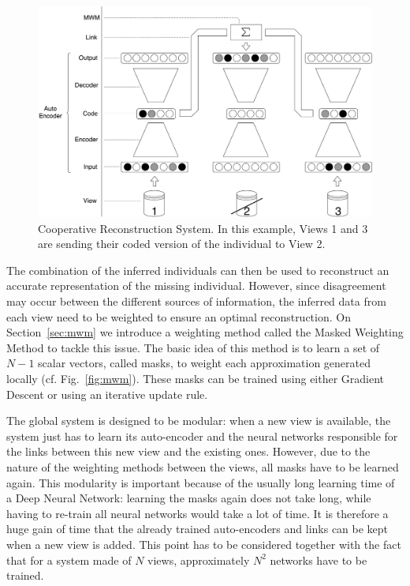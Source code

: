 	\begin{figure}[h]
		\centering
		\includegraphics[width=\textwidth]{img/base_system.pdf}
        \caption{Cooperative Reconstruction System. In this example, Views 1 and
        3 are sending their coded version of the individual to View 2.}
\label{fig:base}
	\end{figure}
	
    The combination of the inferred individuals can then be used to reconstruct an accurate representation of the missing individual. However, since disagreement may occur between the different sources of information, the inferred data from each view need to be weighted to ensure an optimal reconstruction. On Section~\ref{sec:mwm} we introduce a weighting method called the Masked Weighting Method to tackle this issue. The basic idea of this method is to learn a set of $N-1$ scalar vectors, called masks, to weight each approximation generated locally (cf. Fig.~\ref{fig:mwm}). These masks can be trained using either Gradient Descent or using an iterative update rule.
	
The global system is designed to be modular: when a new view is available, the system just has to learn its auto-encoder and the neural networks responsible for the links between this new view and the existing ones. However, due to the nature of the weighting methods between the views, all masks have to be learned again.  This modularity is important because of the usually long learning time of a Deep Neural Network: learning the masks again does not take long, while having to re-train all neural networks would take a lot of time. It is therefore a huge gain of time that the already trained auto-encoders and links can be kept when a new view is added. This point has to be considered together with the fact that for a system made of $N$ views, approximately $N^2$ networks have to be trained.
	

